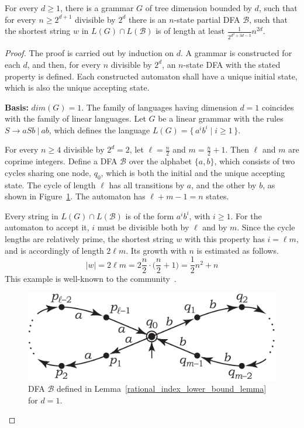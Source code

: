\documentclass[runningheads]{llncs}
\newcommand{\set}[2]{\{ \, #1 \mid #2 \, \}}
\begin{document}
\begin{lemma}\label{rational_index_lower_bound_lemma}
For every $d \geqslant 1$,
there is a grammar $G$ of tree dimension bounded by $d$,
such that for every $n \geqslant 2^{d+1}$ divisible by $2^d$
there is an $n$-state partial DFA $\mathcal{B}$,
such that the shortest string $w$ in $L(G) \cap L(\mathcal{B})$
is of length at least $\frac{1}{2^{d^2 + 3d - 3}} n^{2d}$.
\end{lemma}
\begin{proof}
The proof is carried out by induction on $d$.
A grammar is constructed for each $d$,
and then, for every $n$ divisible by $2^d$,
an $n$-state DFA with the stated property is defined.
Each constructed automaton shall have a unique initial state,
which is also the unique accepting state.

\textbf{Basis:} $dim(G) = 1$.
The family of languages having dimension $d = 1$
coincides with the family of linear languages.
Let $G$ be a linear grammar with the rules $S \to aSb \ | \ ab$,
which defines the language $L(G) = \set{a^i b^i}{i \geqslant 1}$. 

For every $n \geqslant 4$ divisible by $2^d=2$,
let $\ell = \frac{n}{2}$ and $m=\frac{n}{2} + 1$.
Then $\ell$ and $m$ are coprime integers.
Define a DFA $\mathcal{B}$ over the alphabet $\{a, b\}$,
which consists of two cycles
sharing one node, $q_0$,
which is both the initial and the unique accepting state.
The cycle of length $\ell$ has all transitions by $a$, and the other by $b$,
as shown in Figure~\ref{worstd_1}.
The automaton has $\ell+m-1=n$ states.

Every string in $L(G) \cap L(\mathcal{B})$
is of the form $a^i b^i$, with $i \geqslant 1$.
For the automaton to accept it,
$i$ must be divisible both by $\ell$ and by $m$.
Since the cycle lengths are relatively prime,
the shortest string $w$ with this property has $i=\ell m$,
and is accordingly of length $2\ell m$.
Its growth with $n$ is estimated as follows.
\begin{equation*}
	|w|
		=
	2\ell m
		=
	2 \frac{n}{2} \cdot \Big(\frac{n}{2} + 1\Big)
		=
	\frac{1}{2} n^2 + n
\end{equation*}
This example is well-known to the community~\cite{HellingsCFPQ,Yannakakis}. 

\begin{figure}[t]
\centering
\includegraphics[scale=0.9]{rational_index_A1.pdf}
\caption{DFA $\mathcal{B}$ defined in Lemma~\ref{rational_index_lower_bound_lemma} for $d=1$.}
\label{worstd_1}
\end{figure}


\end{proof}
\end{document}
